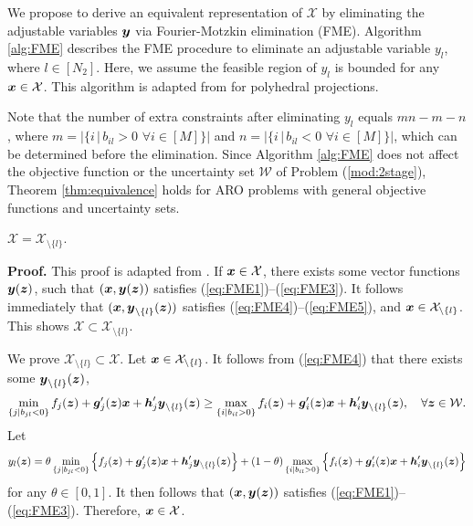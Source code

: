 \documentclass[fleqn,orsc,blindrev]{informs4}
\newcommand{\mb}[1]{\mbox{\boldmath \ensuremath{#1}}}
\begin{document}
	We propose to derive an equivalent representation of $\mathcal{X}$ by eliminating the adjustable variables $\mb{y}$  via Fourier-Motzkin elimination (FME). Algorithm \ref{alg:FME} describes the FME procedure to eliminate an adjustable variable $y_{l}$, where $l\in [N_2]$. Here, we assume the feasible region of $y_{l}$ is bounded for any $\mb{x} \in \mathcal{X}$. This algorithm is adapted from \cite[page 72]{bt97} for polyhedral projections. 

{Note that the number of extra constraints after eliminating $y_l$ equals $mn - m-n$, where $m = |\{ i \, | \, b_{il} > 0 \,\,  \forall i\in [M] \}|$ and  $n = |\{ i \, | \, b_{il} < 0  \,\, \forall i\in [M] \}|$, which can be determined before the elimination.  Since Algorithm \ref{alg:FME} does not affect the objective function or the uncertainty set $\mathcal{W}$ of Problem (\ref{mod:2stage}), Theorem \ref{thm:equivalence} holds for ARO problems with general objective functions and uncertainty sets.	}

	\begin{theorem} \label{thm:equivalence}
		$\mathcal{X} =\mathcal{X}_{\setminus \{l\}}$.
	\end{theorem}
	\textbf{Proof.}
	This proof is adapted from \cite[page 73]{bt97}. If $\mb{x} \in \mathcal{X}$, there exists some vector functions $\mb{y}(\mb{z})$, such that $(\mb{x}, \mb{y}(\mb{z}))$ satisfies  (\ref{eq:FME1})--(\ref{eq:FME3}). It follows immediately that $(\mb{x}, \mb{y}_{\setminus \{l\}}(\mb{z}))$ satisfies (\ref{eq:FME4})--(\ref{eq:FME5}), and $\mb{x} \in \mathcal{X}_{  \setminus \{l\}}$. This shows $\mathcal{X}  \subset \mathcal{X}_{ \setminus \{l\}}$.

	We prove $\mathcal{X}_{ \setminus\{l\}}  \subset \mathcal{X}$. Let $\mb{x} \in \mathcal{X}_{ \setminus\{l\}}$. It follows from (\ref{eq:FME4}) that there exists some $\mb{y}_{\setminus \{l\}}(\mb{z})$,
\begin{equation*}
	\min_{\{j | b_{jl} < 0 \}}  	f_j(\mb{z}) + \mb{g}'_j(\mb{z})\mb{x} + \mb{h}'_j \mb{y}_{\setminus \{l\}}(\mb{z})  \ge \max_{\{i | b_{il} > 0\}}  f_i(\mb{z}) + \mb{g}'_i(\mb{z})\mb{x} + \mb{h}'_i \mb{y}_{ \setminus \{l\}}(\mb{z}), \quad \forall \mb{z}\in \mathcal{W}.
\end{equation*}
	Let 
\begin{equation*}
	y_{l}(\mb{z}) = \theta \min_{\{j | b_{jl} < 0 \}} \left\{ 	f_j(\mb{z}) + \mb{g}'_j(\mb{z})\mb{x} + \mb{h}'_j \mb{y}_{\setminus \{l\}}(\mb{z})\right\} + (1-\theta) \max_{\{i | b_{il} > 0\}} \left\{f_i(\mb{z}) + \mb{g}'_i(\mb{z})\mb{x} + \mb{h}'_i \mb{y}_{ \setminus \{l\}}(\mb{z})\right\} 
\end{equation*}
	for any $\theta \in [0,1]$. It then follows that $(\mb{x}, \mb{y}(\mb{z}))$ satisfies  (\ref{eq:FME1})--(\ref{eq:FME3}). Therefore, $\mb{x} \in \mathcal{X}$.
	 \hfill \Halmos \\
	 
\end{document}
